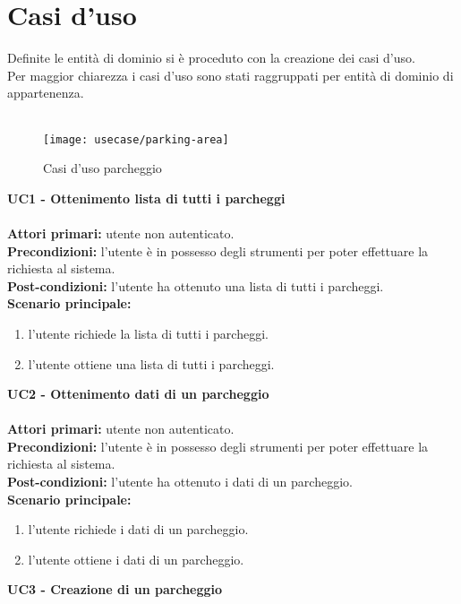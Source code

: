 \section{Casi d'uso}
Definite le entità di dominio si è proceduto con la creazione dei casi d'uso.
\\
Per maggior chiarezza i casi d'uso sono stati raggruppati per entità di dominio di appartenenza.
\\\\
\begin{figure}[H]
    \centering
    \texttt{[image: usecase/parking-area]}
    \caption{Casi d'uso parcheggio}
\end{figure}
\leavevmode\newline
\textbf{UC1 - Ottenimento lista di tutti i parcheggi}
\\\\
\textbf{Attori primari:} utente non autenticato.
\\
\textbf{Precondizioni:} l'utente è in possesso degli strumenti per poter effettuare la richiesta al sistema.
\\
\textbf{Post-condizioni:} l'utente ha ottenuto una lista di tutti i parcheggi.
\\
\textbf{Scenario principale:}
\begin{enumerate}
    \item l'utente richiede la lista di tutti i parcheggi.
    \item l'utente ottiene una lista di tutti i parcheggi.
\end{enumerate}
\leavevmode\newline
\textbf{UC2 - Ottenimento dati di un parcheggio}
\\\\
\textbf{Attori primari:} utente non autenticato.
\\
\textbf{Precondizioni:} l'utente è in possesso degli strumenti per poter effettuare la richiesta al sistema.
\\
\textbf{Post-condizioni:} l'utente ha ottenuto i dati di un parcheggio.
\\
\textbf{Scenario principale:}
\begin{enumerate}
    \item l'utente richiede i dati di un parcheggio.
    \item l'utente ottiene i dati di un parcheggio.
\end{enumerate}
\leavevmode\newline
\textbf{UC3 - Creazione di un parcheggio}
